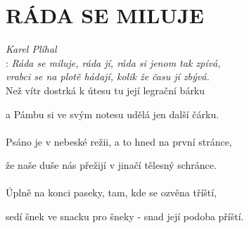 \section*{\Huge RÁDA SE MILUJE}
\emph{Karel Plíhal}\\

\textregistered: \emph{Ráda se miluje, ráda jí,
ráda si jenom tak zpívá,\\
vrabci se na plotě hádají,
kolik že času jí zbývá.}\\

Než vítr dostrká k útesu
tu její legrační bárku

a Pámbu si ve svým notesu udělá jen další čárku.\\

\textregistered\\

Psáno je v nebeské režii, a to hned na první stránce,

že naše duše nás přežijí v jinačí tělesný schránce.\\

\textregistered\\

Úplně na konci paseky, tam, kde se ozvěna tříští,

sedí šnek ve snacku pro šneky - snad její podoba příští.\\

\textregistered

\newpage
